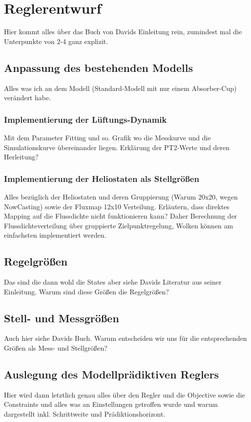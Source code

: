\chapter{Reglerentwurf} \label{ch_Reglerentwurf}
Hier kommt alles über das Buch von Davids Einleitung rein, zumindest mal die Unterpunkte von 2-4 ganz explizit.

\section{Anpassung des bestehenden Modells} \label{sec_AnpassungModell}
Alles was ich an dem Modell (Standard-Modell mit nur einem Absorber-Cup) verändert habe.

\subsection{Implementierung der Lüftungs-Dynamik} \label{subsec_ImplementierungFan}
Mit dem Parameter Fitting und so.
Grafik wo die Messkurve und die Simulationskurve übereinander liegen.
Erklärung der PT2-Werte und deren Herleitung?

\subsection{Implementierung der Heliostaten als Stellgrößen} \label{subsec_ImplementierungHeliostate}
Alles bezüglich der Heliostaten und deren Gruppierung (Warum 20x20, wegen NowCasting) sowie der Fluxmap 12x10 Verteilung.
Erläutern, dass direktes Mapping auf die Flussdichte nicht funktionieren kann?
Daher Berechnung der Flussdichteverteilung über gruppierte Zielpunktregelung, Wolken können am einfachsten implementiert werden.

\section{Regelgrößen} \label{sec_Regelgrößen}
Das sind die dann wohl die States aber siehe Davids Literatur aus seiner Einleitung.
Warum sind diese Größen die Regelgrößen?

\section{Stell- und Messgrößen} \label{sec_StellMessgrößen}
Auch hier siehe Davids Buch.
Warum entscheiden wir uns für die entsprechenden Größen als Mess- und Stellgrößen?

\section{Auslegung des Modellprädiktiven Reglers} \label{sec_AuslegungMPC}
Hier wird dann letztlich genau alles über den Regler und die Objective sowie die Constraints und alles was an Einstellungen getroffen wurde und warum dargestellt inkl. Schrittweite und Prädiktionshorizont.
